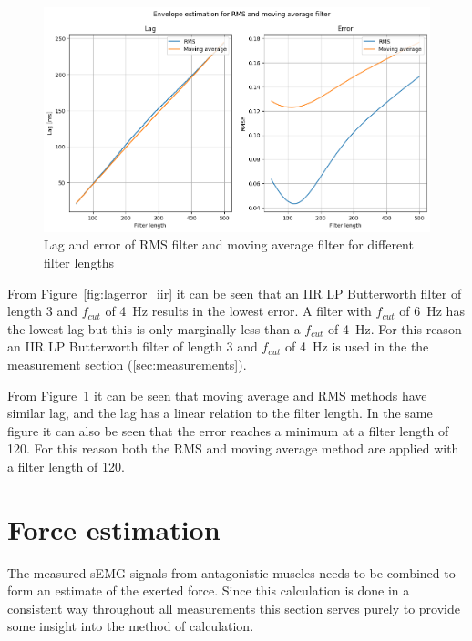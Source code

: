 \begin{figure}[h!t]
	\begin{center}
		\includegraphics[width=1.0\columnwidth]{images/lagerror_rms_and_MA_filter.png}
	\end{center}
	\caption{Lag and error of RMS filter and moving average filter for different filter lengths}
	\label{fig:lagerror_RMS_MA}
\end{figure}

From Figure~\ref{fig:lagerror_iir} it can be seen that an IIR LP Butterworth filter of length 3 and $f_{cut}$ of \SI{4}{\hertz} results in the lowest error. A filter with $f_{cut}$ of \SI{6}{\hertz} has the lowest lag but this is only marginally less than a $f_{cut}$ of \SI{4}{\hertz}. For this reason an IIR LP Butterworth filter of length 3 and $f_{cut}$ of \SI{4}{\hertz} is used in the the measurement section (\ref{sec:measurements}).

From Figure~\ref{fig:lagerror_RMS_MA} it can be seen that moving average and RMS methods have similar lag, and the lag has a linear relation to the filter length. In the same figure it can also be seen that the error reaches a minimum at a filter length of 120. For this reason both the RMS and moving average method are applied with a filter length of 120.

\section{Force estimation}\label{section:force_estimation}
The measured sEMG signals from antagonistic muscles needs to be combined to form an estimate of the exerted force. Since this calculation is done in a consistent way throughout all measurements this section serves purely to provide some insight into the method of calculation.

